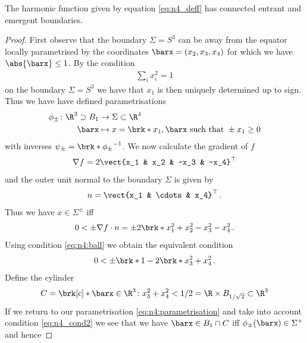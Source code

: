 \begin{proposition}\label{pr:n4_connectedBd}
  The harmonic function given by equation \eqref{eq:n4_deff} has connected entrant and emergent boundaries.
\end{proposition}
\begin{proof}
  First observe that the boundary $\Sigma=S^3$ can be away from the equator locally parametrised by the coordinates $\barx = (x_2,x_3,x_4)$
  for which we have $\abs{\barx}\leq 1$. By the condition
  \begin{align}
    \sum_i x_i^2 = 1\label{eq:n4:ball}
  \end{align}
  on the boundary $\Sigma=S^3$ we have that $x_1$ is then uniquely determined up to sign.
  Thus we have have defined parametrisations
  \begin{align}
    \begin{aligned}\phi_\pm\colon \R^3\supset B_1&\to \Sigma\subset\R^4 \\
    \barx&\mapsto x=\brk*{x_1,\barx}\text{ such that } \pm x_1\geq0
    \end{aligned}\label{eq:n4:parametrisation}
  \end{align}
  with inverses $\psi_\pm = \brk*{\phi_\pm}^{-1}$.
  We now calculate the gradient of $f$
  \begin{align*}
    \nabla f = 2\vect{x_1 & x_2 & -x_3 & -x_4}^\top
  \end{align*}
  and the outer unit normal to the boundary $\Sigma$ is given by
  \begin{align*}
    n = \vect{x_1 & \cdots & x_4}^\top\,.
  \end{align*}
  Thus we have $x\in\Sigma^\pm$ iff
  \begin{align*}
    0<\pm \nabla f\cdot n = \pm 2\brk*{x_1^2+x_2^2-x_3^2-x_4^2}\,.
  \end{align*}
  Using condition \eqref{eq:n4:ball} we obtain the equivalent condition
  \begin{align}
	  0<\pm \brk*{1-2\brk*{x_3^2+x_4^2}}\,.\label{eq:n4_cond2}
  \end{align}
  Define the cylinder
  \begin{align*}
    C = \brk[c]*{\barx\in \R^3\colon x_3^2+x_4^2<1/2} = \R\times B_{1/\sqrt{2}}\subset\R^3
  \end{align*}
  If we return to our parametrisation \eqref{eq:n4:parametrisation} and take into account condition \eqref{eq:n4_cond2} we see that we have $\barx\in B_1\cap C$ iff
  $\phi_\pm(\barx)\in \Sigma^+$ and hence 

\end{proof}
